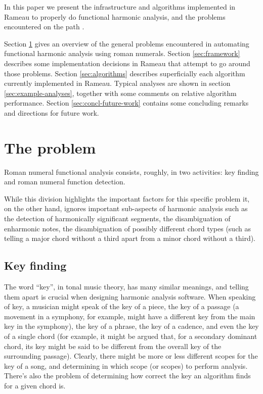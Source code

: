 In this paper we present the infrastructure and algorithms implemented
in Rameau to properly do functional harmonic analysis, and the
problems encountered on the path .

Section \ref{sec:problem} gives an overview of the general problems
encountered in automating functional harmonic analysis using roman
numerals. Section \ref{sec:framework} describes some implementation
decisions in Rameau that attempt to go around those problems. Section
\ref{sec:algorithms} describes superficially each algorithm currently
implemented in Rameau. Typical analyses are shown in section
\ref{sec:example-analyses}, together with some comments on relative
algorithm performance. Section \ref{sec:concl-future-work} contains
some concluding remarks and directions for future work.

\section{The problem}
\label{sec:problem}

Roman numeral functional analysis consists, roughly, in two
activities: key finding and roman numeral function detection. 

While this division highlights the important factors for this specific
problem it, on the other hand, ignores important sub-aspects of
harmonic analysis such as the detection of harmonically significant
segments, the disambiguation of enharmonic notes, the disambiguation
of possibly different chord types (such as telling a major chord
without a third apart from a minor chord without a third).


\subsection{Key finding}
\label{sec:key-finding}


The word ``key'', in tonal music theory, has many similar meanings,
and telling them apart is crucial when designing harmonic analysis
software. When speaking of key, a musician might speak of the key of a
piece, the key of a passage (a movement in a symphony, for example,
might have a different key from the main key in the symphony), the key
of a phrase, the key of a cadence, and even the key of a single chord
(for example, it might be argued that, for a secondary dominant chord,
its key might be said to be different from the overall key of the
surrounding passage). Clearly, there might be more or less different
scopes for the key of a song, and determining in which scope (or
scopes) to perform analysis. There's also the problem of determining
how correct the key an algorithm finds for a given chord is.

